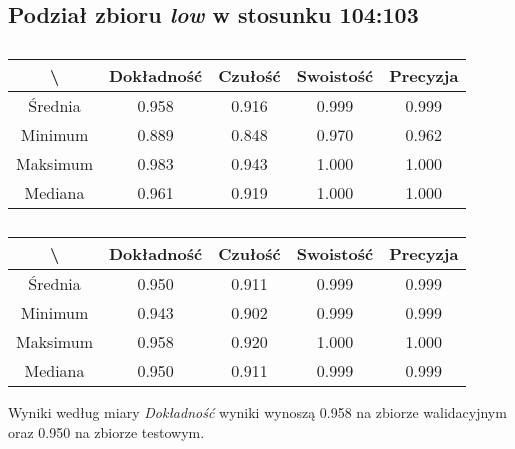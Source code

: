 \subsection{Podział zbioru \textit{low} w stosunku 104:103}
\label{sec:lowsplitd}


\begin{table}[H]
	\centering
	\caption{}
	\vspace{6pt}
	{\footnotesize
		\begin{tabular}{|c|c|c|c|c|}
      \hline \textbackslash & Dokładność & Czułość & Swoistość & Precyzja \\
      \hline Średnia & 0.958 & 0.916 & 0.999 & 0.999 \\
      \hline Minimum & 0.889 & 0.848 & 0.970 & 0.962 \\
      \hline Maksimum & 0.983 & 0.943 & 1.000 & 1.000 \\
      \hline Mediana & 0.961 & 0.919 & 1.000 & 1.000 \\
      \hline
    \end{tabular}
    \label{Tab:lowsplitd_val}
	}
	\vspace{0pt}
\end{table}

\begin{table}[H]
	\centering
	\caption{}
	\vspace{6pt}
	{\footnotesize
		\begin{tabular}{|c|c|c|c|c|}
      \hline \textbackslash & Dokładność & Czułość & Swoistość & Precyzja \\
      \hline Średnia & 0.950 & 0.911 & 0.999 & 0.999 \\
      \hline Minimum & 0.943 & 0.902 & 0.999 & 0.999 \\
      \hline Maksimum & 0.958 & 0.920 & 1.000 & 1.000 \\
      \hline Mediana & 0.950 & 0.911 & 0.999 & 0.999 \\
      \hline
    \end{tabular}
    \label{Tab:lowsplitd_test}
	}
	\vspace{0pt}
\end{table}

Wyniki według miary \textit{Dokładność} wyniki wynoszą 0.958 na zbiorze walidacyjnym oraz 0.950 na zbiorze testowym.
